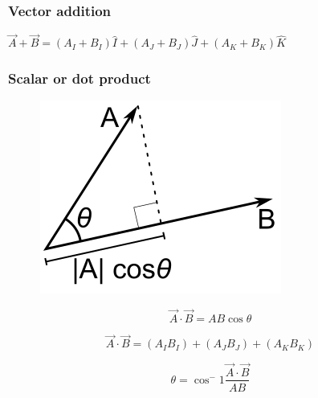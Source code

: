 \documentclass{article}
\begin{document}
\subsubsection*{Vector addition}
$\vec{A} + \vec{B} = (A_I + B_I)\hat{I} + (A_J + B_J)\hat{J} + (A_K + B_K)\hat{K}$

\subsubsection*{Scalar or dot product}

\begin{multicols}{3}
	\begin{figure}[H]
		\centering
		\includegraphics[width=0.6\linewidth]{img/dot_product}
		\label{fig:dot_product}
	\end{figure}

	\columnbreak
	\begin{equation*}
	\boxed{\vec{A}\cdot\vec{B} = AB\cos\theta}
	\end{equation*}

	\begin{equation*}
	\boxed{\vec{A}\cdot\vec{B} = (A_IB_I) + (A_JB_J) + (A_KB_K)}
	\end{equation*}

	\vfill\null
	\columnbreak

	\begin{equation*}
	\boxed{\theta = \cos^-1 \dfrac{\vec{A}\cdot\vec{B}}{AB}}
	\end{equation*}
\end{multicols}
\end{document}
